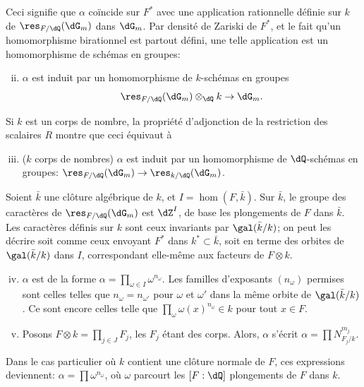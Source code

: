 Ceci signifie que $\alpha$ coïncide sur $F^\ast$ avec une application 
rationnelle définie sur $k$ de $\res_{F/\dQ}(\dG_m)$ dans $\dG_m$. Par 
densité de Zariski de $F^\ast$, et le fait qu'un homomorphisme birationnel 
est partout défini, une telle application est un homomorphisme de schémas 
en groupes: 
\begin{enumerate}[(i)]
\setcounter{enumi}{1}
  \item $\alpha$ est induit par un homomorphisme de $k$-schémas en groupes 
    \[
      \res_{F/\dQ}(\dG_m)\otimes_\dQ k \to \dG_m \text{.} 
    \] 
\end{enumerate}

Si $k$ est un corps de nombre, la propriété d'adjonction de la restriction 
des scalaires $R$ montre que ceci équivaut à 
\begin{enumerate}[(i)]
\setcounter{enumi}{2}
  \item ($k$ corps de nombres) $\alpha$ est induit par un homomorphisme de 
    $\dQ$-schémas en groupes: $\res_{F/\dQ}(\dG_m) \to \res_{k/\dQ}(\dG_m)$. 
\end{enumerate}

Soient $\bar k$ une clôture algébrique de $k$, et $I=\hom(F,\bar k)$. Sur 
$\bar k$, le groupe des caractères de $\res_{F/\dQ}(\dG_m)$ est $\dZ^I$, de 
base les plongements de $F$ dans $\bar k$. Les caractères définis sur $k$ 
sont ceux invariants par $\gal(\bar k/k)$; on peut les décrire soit comme 
ceux envoyant $F^\ast$ dans $k^\ast\subset \bar k$, soit en terme des 
orbites de $\gal(\bar k/k)$ dans $I$, correspondant elle-même aux facteurs de 
$F\otimes k$. 
\begin{enumerate}[(i)]
\setcounter{enumi}{3}
  \item $\alpha$ est de la forme 
    $\alpha=\prod_{\omega\in I} \omega^{n_\omega}$. Les familles d'exposants 
    $(n_\omega)$ permises sont celles telles que $n_\omega=n_{\omega'}$ pour 
    $\omega$ et $\omega'$ dans la même orbite de $\gal(\bar k/k)$. Ce sont 
    encore celles telle que $\prod_\omega \omega(x)^{n_\omega}\in k$ pour tout 
    $x\in F$. 
\item Posons $F\otimes k=\prod_{j\in J} F_j$, les $F_j$ étant des corps. 
    Alors, $\alpha$ s'écrit $\alpha=\prod N_{F_j/k}^{m_j}$. 
\end{enumerate}

Dans le cas particulier où $k$ contient une clôture normale de $F$, ces 
expressions deviennent: $\alpha=\prod \omega^{n_\omega}$, où $\omega$ 
parcourt les $[F:\dQ]$ plongements de $F$ dans $k$. 





